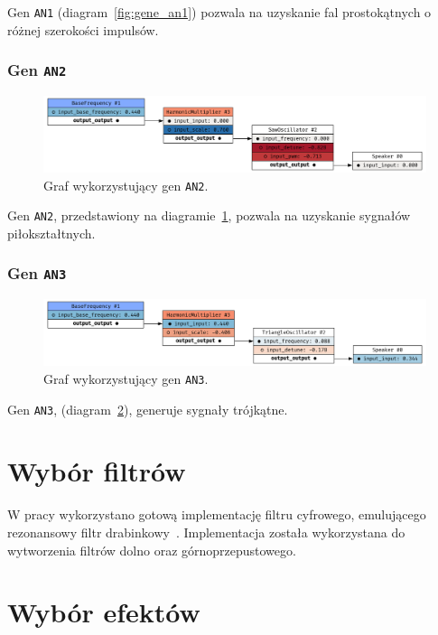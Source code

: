 Gen \texttt{AN1} (diagram~\ref{fig:gene_an1}) pozwala na uzyskanie fal prostokątnych o różnej szerokości impulsów.


\subsubsection{Gen \texttt{AN2}}

\begin{figure}[H]
    \centering
    \includegraphics[width=1.0\linewidth]{rys06/gene_an2.png}
    \caption{
      Graf wykorzystujący gen \texttt{AN2}.
    }\label{fig:gene_an2}
\end{figure}

Gen \texttt{AN2}, przedstawiony na diagramie~\ref{fig:gene_an2}, pozwala na uzyskanie sygnałów piłokształtnych.


\subsubsection{Gen \texttt{AN3}}

\begin{figure}[H]
    \centering
    \includegraphics[width=1.0\linewidth]{rys06/gene_an3.png}
    \caption{
      Graf wykorzystujący gen \texttt{AN3}.
    }\label{fig:gene_an3}
\end{figure}

Gen \texttt{AN3}, (diagram~\ref{fig:gene_an3}), generuje sygnały trójkątne.

\section{Wybór filtrów}

W pracy wykorzystano gotową implementację filtru cyfrowego, emulującego
rezonansowy filtr drabinkowy~\cite{ladder_filter_rust}.
Implementacja została wykorzystana do wytworzenia filtrów dolno oraz górnoprzepustowego.

\section{Wybór efektów}

